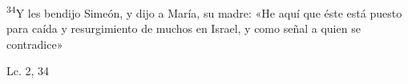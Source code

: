 \documentclass[../../rosario.tex]{subfiles}
\begin{document}
    \textsuperscript{34}Y les bendijo Simeón, y dijo a María, su madre: «He aquí que éste está puesto para caída y resurgimiento de muchos en Israel, y como
    señal a quien se contradice»
    \begin{flushright}
    Lc. 2, 34       
    \end{flushright}
\end{document}

